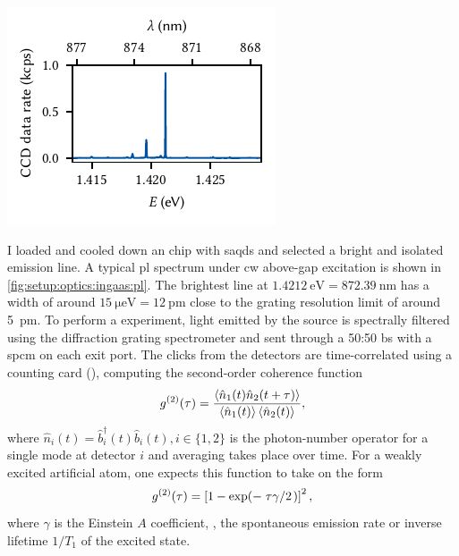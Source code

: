 \begin{marginfigure}
    \centering
    \includegraphics{img/pdf/setup/ingaas_pl}
    \caption[]{
        \Gls{pl} spectrum of a \gls{saqd} under \gls{cw} excitation at \qty{793}{\nano\meter}.
    }
    \label{fig:setup:optics:ingaas:pl}
\end{marginfigure}

I loaded and cooled down an  chip with \glspl{saqd} and selected a bright and isolated emission line.
A typical \gls{pl} spectrum under \gls{cw} above-gap excitation is shown in \cref{fig:setup:optics:ingaas:pl}.
The brightest line at $\qty{1.4212}{\eV} = \qty{872.39}{\nano\meter}$ has a width of around $\qty{15}{\micro\eV} = \qty{12}{\pico\meter}$ close to the grating
resolution limit of around \qty{5}{pm}.
To perform a  experiment, light emitted by the source is spectrally filtered using the \spectrometer diffraction grating spectrometer and sent through a 50:50 \gls{bs} with a \spcm \gls{spcm} on each exit port.
The clicks from the detectors are time-correlated using a counting card (\tagger), computing the second-order coherence function~\cite{Kimble1976,Walls1979,Cohen-Tannoudji1998}
\begin{equation}
    g^{(2)}(\tau) = \frac{\expval{\hat{n}_1(t)\hat{n}_2(t + \tau)}}{\expval{\hat{n}_1(t)}\expval{\hat{n}_2(t)}},
\end{equation}
where $\hat{n}_i(t) = \hat{b}^\dagger_i(t) \hat{b}_i(t), i\in\lbrace 1,2\rbrace$ is the photon-number operator for a single mode at detector $i$ and averaging takes place over time.
For a weakly excited artificial atom, one expects this function to take on the form~\cite{Walls1979}
\begin{equation}\label{eq:setup:optics:g2:fit}
    \g{2}(\tau) = \left[1 - \exp(-\flatfrac{\tau\gamma}{2})\right]^2,
\end{equation}
where $\gamma$ is the Einstein $A$ coefficient, \ie, the spontaneous emission rate or inverse lifetime $1/T_1$ of the excited state.

